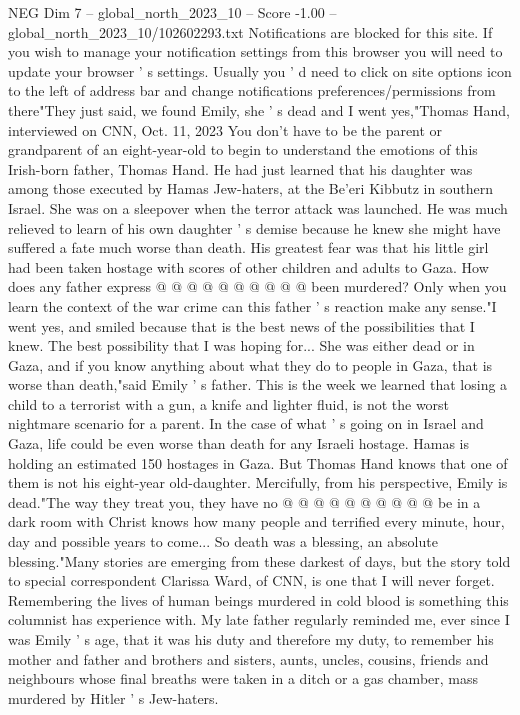 \begin{textsample}{NEG Dim 7 – global\_north\_2023\_10 – Score -1.00 – global\_north\_2023\_10/102602293.txt}  \label{ex:f7_neg_205}
Notifications are blocked for this site.
If you wish to manage your notification settings from this browser you will need to update your browser ' s settings.
Usually you ' d need to click on site options icon to the left of address bar and change notifications preferences/permissions from there"They just said, we found Emily, she ' s dead and I went yes,"Thomas Hand, interviewed on CNN, Oct. 11, 2023 You don't have to be the parent or grandparent of an eight-year-old to begin to understand the emotions of this Irish-born father, Thomas Hand.
He had just learned that his daughter was among those executed by Hamas Jew-haters, at the Be'eri Kibbutz in southern Israel.
She was on a sleepover when the terror attack was launched.
He was much relieved to learn of his own daughter ' s demise because he knew she might have suffered a fate much worse than death.
His greatest fear was that his little girl had been taken hostage with scores of other children and adults to Gaza.
How does any father express @ @ @ @ @ @ @ @ @ @ been murdered?
Only when you learn the context of the war crime can this father ' s reaction make any sense."I went yes, and smiled because that is the best news of the possibilities that I knew.
The best possibility that I was hoping for...
She was either dead or in Gaza, and if you know anything about what they do to people in Gaza, that is worse than death,"said Emily ' s father.
This is the week we learned that losing a child to a terrorist with a gun, a knife and lighter fluid, is not the worst nightmare scenario for a parent.
In the case of what ' s going on in Israel and Gaza, life could be even worse than death for any Israeli hostage.
Hamas is holding an estimated 150 hostages in Gaza.
But Thomas Hand knows that one of them is not his eight-year old-daughter.
Mercifully, from his perspective, Emily is dead."The way they treat you, they have no @ @ @ @ @ @ @ @ @ @ be in a dark room with Christ knows how many people and terrified every minute, hour, day and possible years to come...
So death was a blessing, an absolute blessing."Many stories are emerging from these darkest of days, but the story told to special correspondent Clarissa Ward, of CNN, is one that I will never forget.
Remembering the lives of human beings murdered in cold blood is something this columnist has experience with.
My late father regularly reminded me, ever since I was Emily ' s age, that it was his duty and therefore my duty, to remember his mother and father and brothers and sisters, aunts, uncles, cousins, friends and neighbours whose final breaths were taken in a ditch or a gas chamber, mass murdered by Hitler ' s Jew-haters.

\end{textsample}
